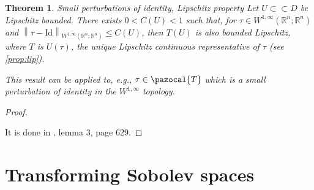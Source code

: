 \documentclass[english,a4paper,10pt,oneside]{scrbook}	%
\theoremstyle{break}
\newtheorem{thm}[equation]{Theorem}
\newtheorem{prop}[equation]{Proposition}
\newenvironment{mproof}[1][\proofname]{%
  \begin{proof}[#1]$ $\par\nobreak\ignorespaces
}{%
  \end{proof}
}
\renewcommand*{\proofname}{Proof}
\theoremstyle{remark}
\newcommand{\mR}{\mathbb{R}}
\newcommand{\norm}[1]{\left\lVert#1\right\rVert}
\newcommand{\cc}{\subset\subset}
\newcommand{\cT}{\pazocal{T}}
\newcommand{\id}{\text{Id}}
\newcommand{\te}{\theta}
\newcommand{\Te}{\Theta}
\begin{document}
\begin{thm}{Small perturbations of identity, Lipschitz property}
\label{thm:ptb_id_lip}
Let $U\cc D$ be Lipschitz bounded. There exists $0<C(U)<1$ such that, for $\tau \in W^{1,\infty}(\mR^n;\mR^n)$ and $\norm{\tau - \id}_{W^{1,\infty}(\mR^n;\mR^n)}\leq C(U)$, then $T(U)$ is also bounded Lipschitz, where $T$ is $U(\tau)$, the unique Lipschitz continuous representative of $\tau$ (see \cref{prop:lip}).

This result can be applied to, e.g., $\tau \in \cT$ which is a small perturbation of identity in the $W^{1,\infty}$ topology.
\end{thm}

\begin{mproof}
It is done in \cite{bello}, lemma 3, page 629.
\end{mproof}

%
%
%
%
%
%
%
%
%
%
%

\section{Transforming Sobolev spaces}
\end{document}
